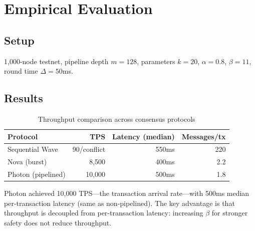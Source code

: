 \section{Empirical Evaluation}

\label{sec:evaluation}

\subsection{Setup}

1,000-node testnet, pipeline depth $m = 128$, parameters $k = 20$, $\alpha = 0.8$,
$\beta = 11$, round time $\Delta = 50$ms.

\subsection{Results}

\begin{table}[h]
\centering
\begin{tabular}{@{}lrrr@{}}
\toprule
\textbf{Protocol} & \textbf{TPS} & \textbf{Latency (median)} & \textbf{Messages/tx} \\
\midrule
Sequential Wave & 90/conflict & 550ms & 220 \\
Nova (burst) & 8,500 & 400ms & 2.2 \\
Photon (pipelined) & 10,000 & 500ms & 1.8 \\
\bottomrule
\end{tabular}
\caption{Throughput comparison across consensus protocols}
\label{tab:photon-results}
\end{table}

Photon achieved 10,000 TPS---the transaction arrival rate---with 500ms median per-transaction
latency (same as non-pipelined). The key advantage is that throughput is decoupled from
per-transaction latency: increasing $\beta$ for stronger safety does not reduce throughput.

